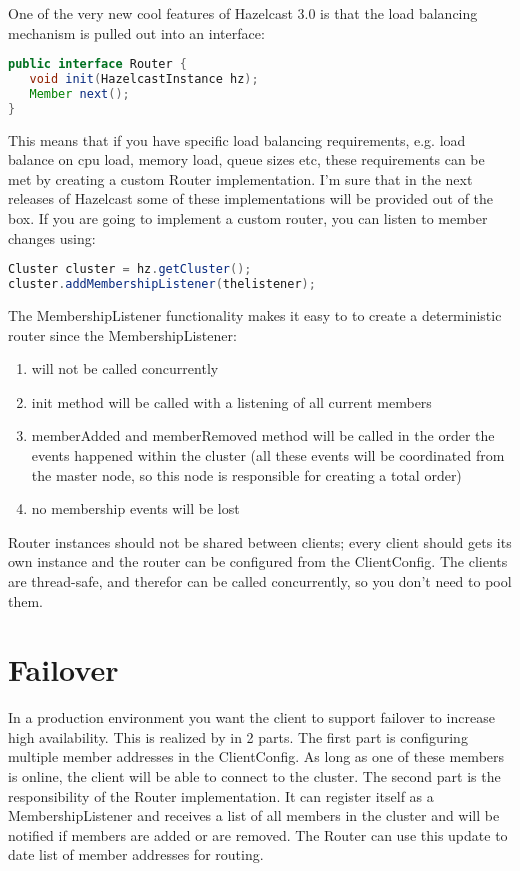 One of the very new cool features of Hazelcast 3.0 is that the load balancing mechanism is pulled out into an interface:
\begin{lstlisting}[language=java]
public interface Router {
   void init(HazelcastInstance hz);
   Member next();
}
\end{lstlisting}
This means that if you have specific load balancing requirements, e.g. load balance on cpu load, memory load, queue sizes etc, these requirements can be met by creating a custom Router implementation. I'm sure that in the next releases of Hazelcast some of these implementations will be provided out of the box. If you are going to implement a custom router, you can listen to member changes using:
\begin{lstlisting}[language=java]
Cluster cluster = hz.getCluster();
cluster.addMembershipListener(thelistener);
\end{lstlisting}

The MembershipListener functionality makes it easy to to create a deterministic router since the MembershipListener:
\begin{enumerate}
\item will not be called concurrently
\item init method will be called with a listening of all current members
\item memberAdded and memberRemoved method will be called in the order the events happened within the cluster (all these events will be coordinated from the master node, so this node is responsible for creating a total order)
\item no membership events will be lost
\end{enumerate}

Router instances should not be shared between clients; every client should gets its own instance and the router can be configured from the ClientConfig. The clients are thread-safe, and therefor can be called concurrently, so you don't need to pool them.

\section{Failover} 
In a production environment you want the client to support failover to increase high availability. This is realized by in 2 parts. The first part is configuring multiple member addresses in the ClientConfig. As long as one of these members is online, the client will be able to connect to the cluster. The second part is the responsibility of the Router implementation. It can register itself as a MembershipListener and receives a list of all members in the cluster and will be notified if members are added or are removed. The Router can use this update to date list of member addresses for routing.

